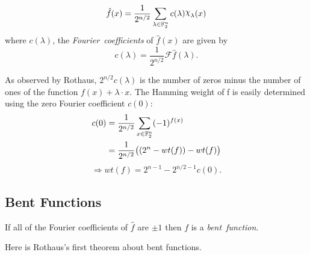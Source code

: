 
\begin{lemma}
\begin{equation}\label{eqn:rewrite-pseudo}
	\hat{f}(x)
    =\frac{1}{2^{n/2}}
      \sum_{\lambda\in\gftwo^n}c(\lambda)\Chi_\lambda(x)
\end{equation}
	where $c(\lambda)$, the {\em Fourier\ coefficients} of $\hat{f}(x)$ are
  given by
	\[
  c(\lambda)=\frac{1}{2^{n/2}}\mathcal{F}\hat{f}(\lambda).
	\]
\end{lemma}

\par As observed by Rothaus, $2^{n/2}c(\lambda)$ is the number of zeros
minus the number of ones of the function $f(x)+\lambda\cdot x$. The Hamming
weight of f is easily determined using the zero Fourier coefficient $c(0)$:
\begin{align*}
	c(0)&=\frac{1}{2^{n/2}}\sum_{x\in\mathbb{F}_2^n}(-1)^{f(x)}\\
	&=\frac{1}{2^{n/2}}\big((2^n-wt(f))-wt(f)\big)
\end{align*}
\begin{equation}
  \Rightarrow wt(f)=2^{n-1}-2^{n/2-1}c(0).
\end{equation}

\subsection{Bent Functions}
\begin{definition}\label{def:bent-function}
  If all of the Fourier coefficients of $\hat{f}$ are $\pm1$ then
  $f$ is a {\em bent\ function}.
\end{definition}

\par Here is Rothaus's first theorem about bent functions.

